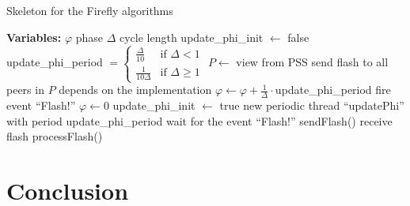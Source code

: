 \documentclass[a4paper, 11pt]{article}
\renewcommand{\phi}{\varphi}
\theoremstyle{plain}
\theoremstyle{definition}
\begin{document}
  
   \begin{algorithm}
     \caption{Skeleton for the Firefly algorithms}
     \label{alg:firefly-skeleton}
     \begin{algorithmic}
       \State \textbf{Variables:}
       \State $\phi$ \Comment phase
       \State $\Delta$ \Comment cycle length
       \State update\_phi\_init $\gets$ false 
       \State update\_phi\_period $= \begin{cases} \frac{\Delta}{10} & \text{if } \Delta < 1 \\
         \frac{1}{10\Delta} & \text{if } \Delta \geq 1 \end{cases}$
       \State
         \State $P \gets$ view from PSS
         \State send flash to all peers in $P$
       \EndFunction
       \State
         \State depends on the implementation
       \EndFunction
       \State
         \If{$\phi < 1$}
           \State $\phi \gets \phi + \frac{1}{\Delta} \cdot $update\_phi\_period
         \Else
           \State fire event ``Flash!''
           \State $\phi \gets 0$
         \EndIf
       \EndFunction
       \State
            \State update\_phi\_init $\gets$ true
            \State new periodic thread ``updatePhi'' with period update\_phi\_period
          \EndIf
          \State wait for the event ``Flash!''
          \State sendFlash()
       \EndFunction
       \State
         \State receive flash
         \State processFlash()
       \EndFunction
     \end{algorithmic}
   \end{algorithm}



\section{Conclusion}
\label{sec:conclusion}

  



    
    
    












	
\end{document}
